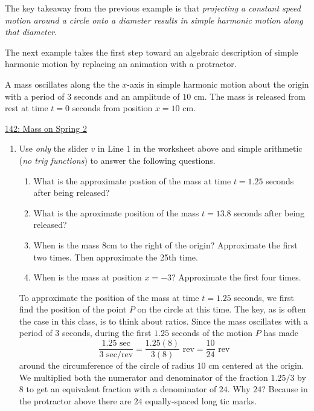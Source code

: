 \documentclass{ximera}
\begin{document}
The key takeaway from the previous example is that \emph{projecting a constant speed motion around a circle onto a diameter results in simple harmonic motion along that diameter}.  

The next example takes the first step toward an algebraic description of simple harmonic motion by replacing an animation with a protractor.

\begin{example}  \label{Ex:PDoEr3rdfsx}
A mass oscillates along the the $x$-axis in simple harmonic motion  about the origin  with a period of $3$ seconds and an amplitude of $10$ cm. The mass is released from rest at time $t=0$ seconds from position $x=10$ cm.

\begin{onlineOnly}
    \begin{center}
\end{center}
\end{onlineOnly}

\href{https://www.desmos.com/calculator/rqdenajviu}{142: Mass on Spring 2 }

\begin{enumerate}

\item Use \emph{only} the slider $v$ in Line 1 in the worksheet above and simple arithmetic (\emph{no trig functions})  to answer the following questions.

\begin{enumerate}
\item What is the approximate postion of the mass at time $t=1.25$ seconds after being released?

\item What is the aproximate position of the mass $t=13.8$ seconds after being released?

\item When is the mass $8$cm to the right of the origin? Approximate the first two times. Then approximate the 25th time.

\item When is the mass  at position $x = -3$? Approximate the first four times.  
\end{enumerate}




\begin{explanation}

To approximate the position of the mass at time $t=1.25$ seconds, we first find the position of the point $P$ on the circle at this time. The key, as is often the case in this class, is to think about ratios. Since the mass oscillates with a period of $3$ seconds, during the first $1.25$ seconds of the motion $P$ has made
\[
    \frac{1.25 \text{ sec}}{3 \text{ sec/rev}} = \frac{1.25(8)}{3(8)}\text{ rev} = \frac{10}{24} \text{ rev}
\]
around the circumference of the circle of radius $10$ cm centered at the origin. We multiplied both the numerator and denominator of the fraction $1.25/3$ by 8 to get an equivalent fraction with a denominator of $24$. Why $24$? Because in the protractor above there are $24$ equally-spaced long tic marks. 


\end{explanation}
\end{enumerate}
\end{example}
\end{document}
